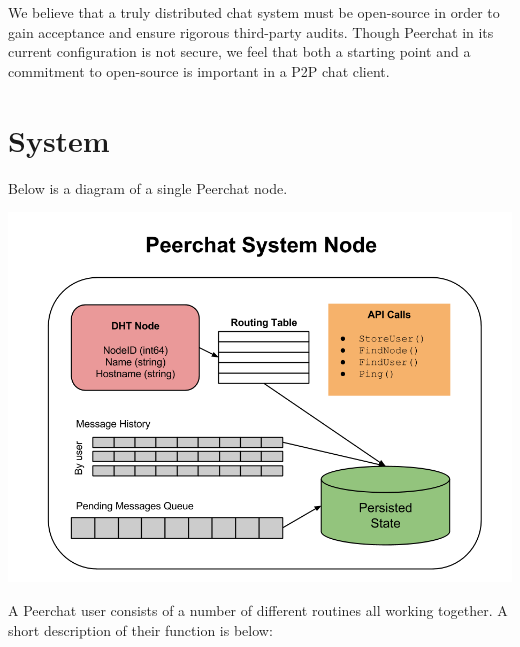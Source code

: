 \documentclass{article}
\begin{document}
We believe that a truly distributed chat system must be open-source in order to gain acceptance and ensure rigorous third-party audits. Though Peerchat in its current configuration is not secure, we feel that both a starting point and a commitment to open-source is important in a P2P chat client. 

\section{System}

Below is a diagram of a single Peerchat node. 

\includegraphics[scale=0.5]{peerchat}

A Peerchat user consists of a number of different routines all working together. A short description of their function is below: \\
\end{document}
